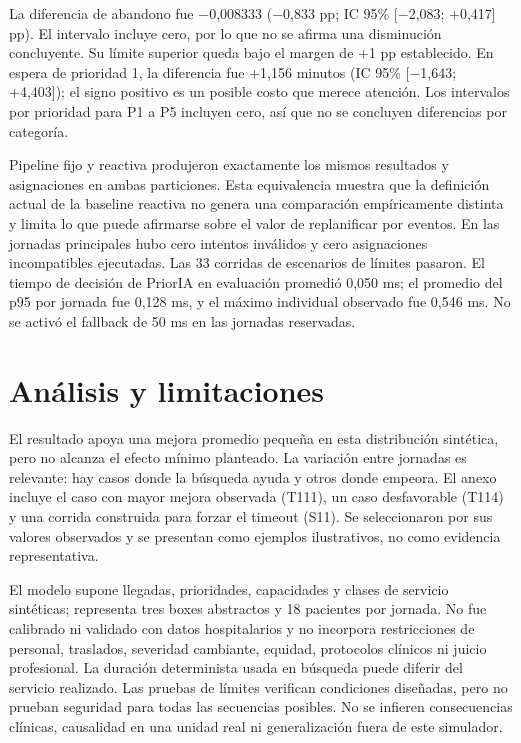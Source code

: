 \documentclass[conference]{IEEEtran}
\begin{document}
La diferencia de abandono fue −0,008333 (−0,833 pp; IC 95\% [−2,083; +0,417] pp). El intervalo incluye cero, por lo que no se afirma una disminución concluyente. Su límite superior queda bajo el margen de +1 pp establecido. En espera de prioridad 1, la diferencia fue +1,156 minutos (IC 95\% [−1,643; +4,403]); el signo positivo es un posible costo que merece atención. Los intervalos por prioridad para P1 a P5 incluyen cero, así que no se concluyen diferencias por categoría.

Pipeline fijo y reactiva produjeron exactamente los mismos resultados y asignaciones en ambas particiones. Esta equivalencia muestra que la definición actual de la baseline reactiva no genera una comparación empíricamente distinta y limita lo que puede afirmarse sobre el valor de replanificar por eventos. En las jornadas principales hubo cero intentos inválidos y cero asignaciones incompatibles ejecutadas. Las 33 corridas de escenarios de límites pasaron. El tiempo de decisión de PriorIA en evaluación promedió 0,050 ms; el promedio del p95 por jornada fue 0,128 ms, y el máximo individual observado fue 0,546 ms. No se activó el fallback de 50 ms en las jornadas reservadas.

\section{Análisis y limitaciones}
El resultado apoya una mejora promedio pequeña en esta distribución sintética, pero no alcanza el efecto mínimo planteado. La variación entre jornadas es relevante: hay casos donde la búsqueda ayuda y otros donde empeora. El anexo incluye el caso con mayor mejora observada (T111), un caso desfavorable (T114) y una corrida construida para forzar el timeout (S11). Se seleccionaron por sus valores observados y se presentan como ejemplos ilustrativos, no como evidencia representativa.

El modelo supone llegadas, prioridades, capacidades y clases de servicio sintéticas; representa tres boxes abstractos y 18 pacientes por jornada. No fue calibrado ni validado con datos hospitalarios y no incorpora restricciones de personal, traslados, severidad cambiante, equidad, protocolos clínicos ni juicio profesional. La duración determinista usada en búsqueda puede diferir del servicio realizado. Las pruebas de límites verifican condiciones diseñadas, pero no prueban seguridad para todas las secuencias posibles. No se infieren consecuencias clínicas, causalidad en una unidad real ni generalización fuera de este simulador.
\end{document}
